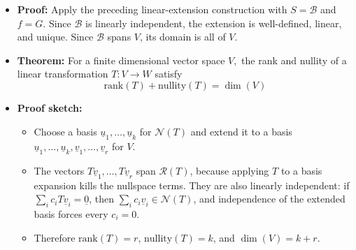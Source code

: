 \documentclass[11pt,twoside]{report}
\newcommand{\vecnot}{\underline}
\newcommand{\Rank}{\mathrm{rank}}
\newcommand{\Nullity}{\mathrm{nullity}}
\begin{document}
\begin{itemize}
\item \textbf{Proof:} Apply the preceding linear-extension construction with $S=\mathcal{B}$ and $f=G$.  Since $\mathcal{B}$ is linearly independent, the extension is well-defined, linear, and unique.  Since $\mathcal{B}$ spans $V$, its domain is all of $V$.



\item \textbf{Theorem:} 
For a finite dimensional vector space $V,$  the rank and nullity of a linear transformation $T \colon V  \to  W$ satisfy 
\begin{equation*}
\Rank (T) + \Nullity (T) = \dim (V)
\end{equation*}


\item \textbf{Proof sketch:}
\begin{itemize}
\item Choose a basis $\vecnot{u}_1,\ldots,\vecnot{u}_k$ for $\mathcal{N}(T)$ and extend it to a basis $\vecnot{u}_1,\ldots,\vecnot{u}_k,\vecnot{v}_1,\ldots,\vecnot{v}_r$ for $V$.
\item The vectors $T\vecnot{v}_1,\ldots,T\vecnot{v}_r$ span $\mathcal{R}(T)$, because applying $T$ to a basis expansion kills the nullspace terms.  They are also linearly independent: if $\sum_i c_iT\vecnot{v}_i=\vecnot{0}$, then $\sum_i c_i\vecnot{v}_i\in\mathcal{N}(T)$, and independence of the extended basis forces every $c_i=0$.
\item Therefore $\Rank(T)=r$, $\Nullity(T)=k$, and $\dim(V)=k+r$.
\end{itemize}




\end{itemize}
\end{document}

